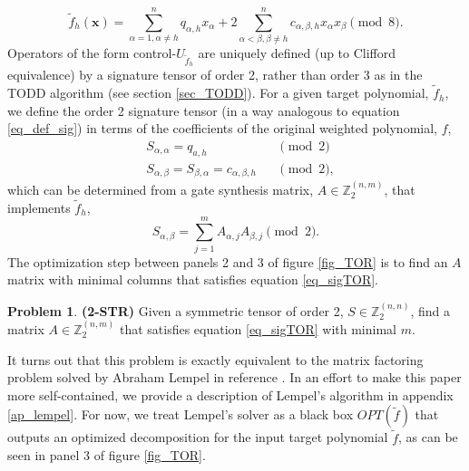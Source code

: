 \documentclass[notitlepage]{article}
\theoremstyle{definition}
\theoremstyle{problem}
\newtheorem{problem}{Problem}[section]
\theoremstyle{lemma}
\begin{document}
\begin{equation}
\tilde{f}_h(\mathbf{x}) = \sum_{\alpha=1, \alpha\neq h}^n q_{\alpha,h} x_\alpha + 2\sum_{\alpha<\beta,\beta\neq h}^{n}c_{\alpha,\beta,h}x_\alpha x_\beta \pmod{8}.
\end{equation}
Operators of the form control-$U_{\tilde{f}_{h}}$ are uniquely defined (up to Clifford equivalence) by a signature tensor of order 2, rather than order 3 as in the TODD algorithm (see section \ref{sec_TODD}). For a given target polynomial, $\tilde{f}_{h}$, we define the order 2 signature tensor (in a way analogous to equation \ref{eq_def_sig}) in terms of the coefficients of the original weighted polynomial, $f$,
\begin{align}
&S_{\alpha,\alpha} = q_{a,h} &&\pmod{2} \\
&S_{\alpha,\beta} = S_{\beta,\alpha} = c_{\alpha,\beta,h} &&\pmod{2},
\end{align}
which can be determined from a gate synthesis matrix, $A\in \mathbb{Z}_2^{(n,m)}$, that implements $\tilde{f}_h$,
\begin{equation}
\label{eq_sigTOR}
S_{\alpha,\beta} = \sum_{j=1}^{m}A_{\alpha,j}A_{\beta,j} \pmod{2}.
\end{equation}
The optimization step between panels 2 and 3 of figure \ref{fig_TOR} is to find an $A$ matrix with minimal columns that satisfies equation \ref{eq_sigTOR}.
\begin{problem}{\textbf{(2-STR)}}
	Given a symmetric tensor of order 2, $S\in \mathbb{Z}_2^{(n,n)}$, find a matrix $A \in \mathbb{Z}_2^{(n,m)}$ that satisfies equation \ref{eq_sigTOR} with minimal $m$.
\end{problem}
It turns out that this problem is exactly equivalent to the matrix factoring problem solved by Abraham Lempel in reference \cite{8_Lempel_1975}. In an effort to make this paper more self-contained, we provide a description of Lempel's algorithm in appendix \ref{ap_lempel}. For now, we treat Lempel's solver as a black box $OPT(\tilde{f})$ that outputs an optimized decomposition for the input target polynomial $\tilde{f}$, as can be seen in panel 3 of figure \ref{fig_TOR}.

\end{document}

